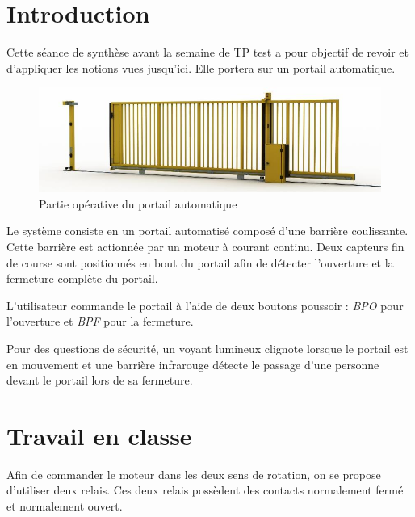 \documentclass[11pt]{article}
\begin{document}
\UPSTIbuildPage


\tableofcontents

\pagebreak
\section{Introduction}
Cette séance de synthèse avant la semaine de TP test a pour objectif de revoir et d'appliquer les notions vues jusqu'ici. Elle portera sur un portail automatique.

\begin{figure}[ht]
	\centering
	\includegraphics[width=.85\linewidth]{images/portail.jpg}
	\caption{Partie opérative du portail automatique}
	\label{fig:schemaPartieOperative}
\end{figure}

Le système consiste en un portail automatisé composé d'une barrière coulissante. Cette barrière est actionnée par un moteur à courant continu. Deux capteurs fin de course sont positionnés en bout du portail afin de détecter l'ouverture et la fermeture complète du portail.

L'utilisateur commande le portail à l'aide de deux boutons poussoir : \textit{BPO} pour l'ouverture et \textit{BPF} pour la fermeture.

Pour des questions de sécurité, un voyant lumineux clignote lorsque le portail est en mouvement et une barrière infrarouge détecte le passage d'une personne devant le portail lors de sa fermeture.

\section{Travail en classe}
\begin{UPSTIactivite}



	Afin de commander le moteur dans les deux sens de rotation, on se propose d'utiliser deux relais. Ces deux relais possèdent des contacts normalement fermé et normalement ouvert.



\end{UPSTIactivite}
\end{document}
